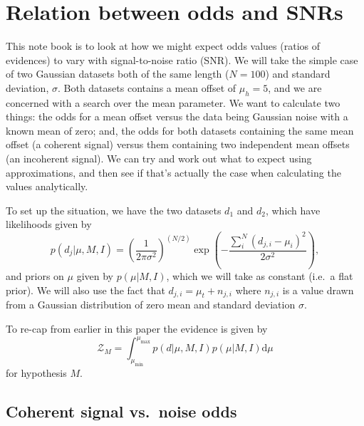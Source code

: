 \section{Relation between odds and SNRs}\label{app:oddratios}

This note book is to look at how we might expect odds values (ratios of evidences) to vary with signal-to-noise ratio (SNR). We will take the simple case of two Gaussian
datasets both of the same length ($N = 100$) and standard deviation, $\sigma$. Both datasets contains a mean offset of $\mu_h = 5$, and we are concerned with a
search over the mean parameter. We want to calculate two things: the odds for a mean offset versus the data being Gaussian noise with a known mean of zero; and,
the odds for both datasets containing the same mean offset (a coherent signal) versus them containing two independent mean offsets (an incoherent signal). We can
try and work out what to expect using approximations, and then see if that's actually the case when calculating the values analytically.

To set up the situation, we have the two datasets $d_1$ and $d_2$, which have likelihoods given by
\begin{equation}
 p(d_j|\mu,M,I) = \left(\frac{1}{2\pi\sigma^2}\right)^{(N/2)} \exp{\left(-\frac{\sum_i^N (d_{j,i}-\mu_i)^2}{2\sigma^2}\right)},
\end{equation}
and priors on $\mu$ given by $p(\mu|M,I)$, which we will take as constant (i.e.\ a flat prior). We will also use the fact that $d_{j,i} = \mu_t + n_{j,i}$
where $n_{j,i}$ is a value drawn from a Gaussian distribution of zero mean and standard deviation $\sigma$.

To re-cap from earlier in this paper the evidence is given by
\begin{equation}
\mathcal{Z}_M = \int_{\mu_{\text{min}}}^{\mu_{\text{max}}} p(d|\mu, M, I) p(\mu|M,I) {\text{d}\mu}
\end{equation}
for hypothesis $M$.

\subsection{Coherent signal vs.\ noise odds}

